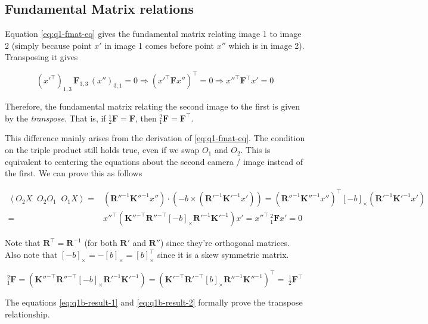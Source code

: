 \subsection{Fundamental Matrix relations}

Equation \ref{eq:q1-fmat-eq} gives the fundamental matrix relating image 1 to image 2 (simply because point $x'$ in image 1 comes before point $x''$ which is in image 2). Transposing it gives

\begin{equation}
    (x'^\top)_{1,3} \, \mathbf{F}_{3,3} \, (x'')_{3, 1} = 0 \Rightarrow \left ( x'^\top \mathbf{F} x'' \right )^\top = 0
    \Rightarrow x''^\top \mathbf{F}^\top x' = 0
    \label{eq:q1b-result-1}
\end{equation}

Therefore, the fundamental matrix relating the second image to the first is given by the \textit{transpose}. That is, if $^1_2\mathbf{F} = \mathbf{F}$, then $^2_1\mathbf{F} = \mathbf{F}^\top$.

This difference mainly arises from the derivation of \ref{eq:q1-fmat-eq}. The condition on the triple product still holds true, even if we swap $O_1$ and $O_2$. This is equivalent to centering the equations about the second camera / image instead of the first. We can prove this as follows

\begin{align}
    \left \langle O_2 X \;\; O_2 O_1 \;\; O_1 X \right \rangle =& \left ( \mathbf{R}''^{-1} \mathbf{K}''^{-1} x'' \right ) \cdot \left ( -b \times \left ( \mathbf{R}'^{-1} \mathbf{K}'^{-1} x' \right ) \right ) =
        \left ( \mathbf{R}''^{-1} \mathbf{K}''^{-1} x'' \right )^\top \left [ -b \right ]_\times \left ( \mathbf{R}'^{-1} \mathbf{K}'^{-1} x' \right )
    \nonumber \\
    =& x''^\top \left ( \mathbf{K}''^{-\top} \mathbf{R}''^{-\top} \left [ -b \right ]_\times \mathbf{R}'^{-1} \mathbf{K}'^{-1} \right ) x' = x''^\top \, ^2_1\mathbf{F} x' = 0
\end{align}

Note that $\mathbf{R}^\top = \mathbf{R}^{-1}$ (for both $\mathbf{R}'$ and $\mathbf{R}''$) since they're orthogonal matrices. Also note that $\left [ -b \right ]_\times = - \left [ b \right ]_\times = \left [ b \right ]_\times^\top$ since it is a skew symmetric matrix.

\begin{equation}
    ^2_1\mathbf{F} = \left ( \mathbf{K}''^{-\top} \mathbf{R}''^{-\top} \left [ -b \right ]_\times \mathbf{R}'^{-1} \mathbf{K}'^{-1} \right ) = \left ( \mathbf{K}'^{-\top} \mathbf{R}'^{-\top} \left [ b \right ]_\times \mathbf{R}''^{-1} \mathbf{K}''^{-1} \right )^\top = \; ^1_2\mathbf{F}^\top
    \label{eq:q1b-result-2}
\end{equation}

The equations \ref{eq:q1b-result-1} and \ref{eq:q1b-result-2} formally prove the transpose relationship.
